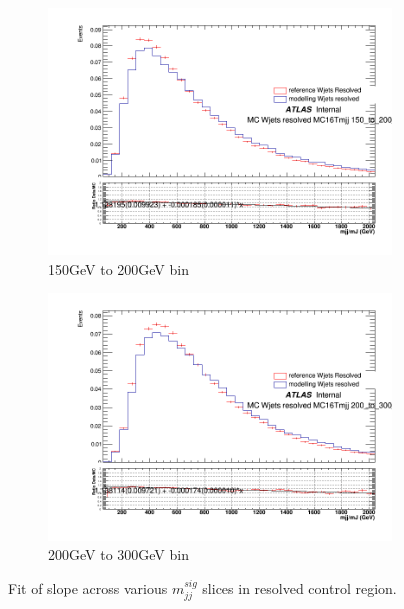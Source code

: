 \begin{figure}[ht]
    \begin{subfigure}[b]{0.3\textwidth}
        \centering
        \includegraphics[width=\textwidth]{figures/mjjreweight1lep/resolved_Wjets150_to_200_GeVMC16T.png}
        \caption{150GeV to 200GeV bin}
        \label{fig:resolved_Wjets150to200}
    \end{subfigure}
    \begin{subfigure}[b]{0.3\textwidth}
        \centering
        \includegraphics[width=\textwidth]{figures/mjjreweight1lep/resolved_Wjets200_to_300_GeVMC16T.png}
        \caption{200GeV to 300GeV bin}
        \label{fig:resolved_Wjets200to300}
    \end{subfigure}
    \caption{Fit of \mjjtag slope across various $m_{jj}^{sig}$ slices in \Wjets resolved control region.}
    \label{fig:mjjReweight1LepResPtBins}
\end{figure}

